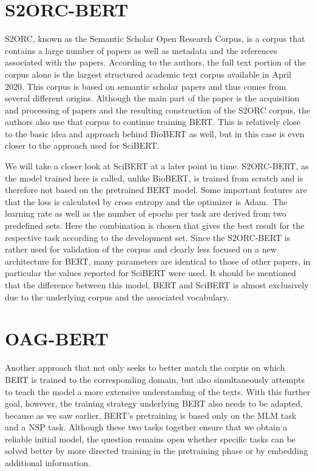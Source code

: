 \section{S2ORC-BERT}
S2ORC, known as the Semantic Scholar Open Research Corpus, is a corpus that contains a large number of papers as well as metadata and the references associated with the papers. According to the authors, the full text portion of the corpus alone is the largest structured academic text corpus available in April 2020.\cite{Lo2019} This corpus is based on semantic scholar papers and thus comes from several different origins. Although the main part of the paper is the acquisition and processing of papers and the resulting construction of the S2ORC corpus, the authors also use that corpus to continue training BERT. This is relatively close to the basic idea and approach behind BioBERT as well, but in this case is even closer to the approach used for SciBERT. \cite{Beltagy2019,Lo2019}

We will take a closer look at SciBERT at a later point in time. S2ORC-BERT, as the model trained here is called, unlike BioBERT, is trained from scratch and is therefore not based on the pretrained BERT model. Some important features are that the loss is calculated by cross entropy and the optimizer is Adam. The learning rate as well as the number of epochs per task are derived from two predefined sets. Here the combination is chosen that gives the best result for the respective task according to the development set. Since the S2ORC-BERT is rather used for validation of the corpus and clearly less focused on a new architecture for BERT, many parameters are identical to those of other papers, in particular the values reported for SciBERT were used.\cite{Lo2019} It should be mentioned that the difference between this model, BERT and SciBERT is almost exclusively due to the underlying corpus and the associated vocabulary.  




\section{OAG-BERT}
	Another approach that not only seeks to better match the corpus on which BERT is trained to the corresponding domain, but also simultaneously attempts to teach the model a more extensive understanding of the texts. With this further goal, however, the training strategy underlying BERT also needs to be adapted, because as we saw earlier, BERT's pretraining is based only on the MLM task and a NSP task. Although these two tasks together ensure that we obtain a reliable initial model, the question remains open whether specific tasks can be solved better by more directed training in the pretraining phase or by embedding additional information. \cite{Devlin2018,Liu2021}
	

